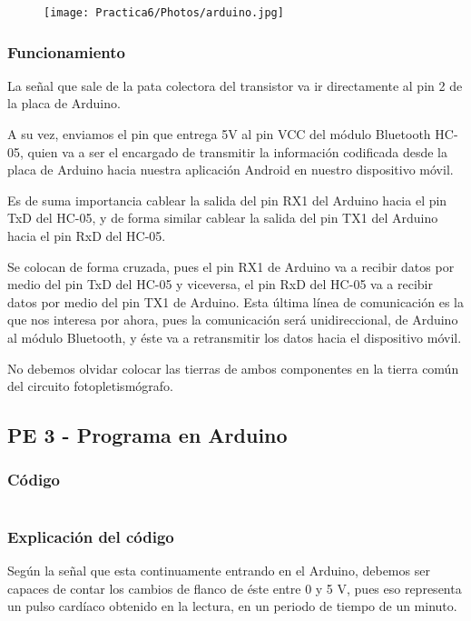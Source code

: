 \documentclass[12pt]{article}
\begin{document}
    \begin{figure}[h!]
                \centering
                \texttt{[image: Practica6/Photos/arduino.jpg]}
    \end{figure}
    
    \subsubsection{Funcionamiento}
    La señal que sale de la pata colectora del transistor va ir directamente al pin 2 de la placa de Arduino.
    
    A su vez, enviamos el pin que entrega 5V al pin VCC del módulo Bluetooth HC-05, quien va a ser el encargado de transmitir la información codificada desde la placa de Arduino hacia nuestra aplicación Android en nuestro dispositivo móvil.
    
    Es de suma importancia cablear la salida del pin RX1 del Arduino hacia el pin TxD del HC-05, y de forma similar cablear la salida del pin TX1 del Arduino hacia el pin RxD del HC-05.
    
    Se colocan de forma cruzada, pues el pin RX1 de Arduino va a recibir datos por medio del pin TxD del HC-05 y viceversa, el pin RxD del HC-05 va a recibir datos por medio del pin TX1 de Arduino. Esta última línea de comunicación es la que nos interesa por ahora, pues la comunicación será unidireccional, de Arduino al módulo Bluetooth, y éste va a retransmitir los datos hacia el dispositivo móvil.
    
    No debemos olvidar colocar las tierras de ambos componentes en la tierra común del circuito fotopletismógrafo.
    
    \newpage
    \subsection{PE 3 - Programa en Arduino}
    \subsubsection{Código}
    \inputminted{Java}{Code/PULSE.c}
    
    \subsubsection{Explicación del código}
    Según la señal que esta continuamente entrando en el Arduino, debemos ser capaces de contar los cambios de flanco de éste entre 0 y 5 V, pues eso representa un pulso cardíaco obtenido en la lectura, en un periodo de tiempo de un minuto.
    
\end{document}
